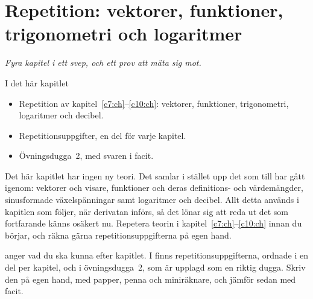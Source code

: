 
\chapter{Repetition: vektorer, funktioner, trigonometri och logaritmer}
\label{c11:ch}

{\large\itshape Fyra kapitel i ett svep, och ett prov att mäta sig mot.\par}

\begin{chapterbox}{I det här kapitlet}
\begin{itemize}
  \item Repetition av kapitel~\ref{c7:ch}--\ref{c10:ch}: vektorer, funktioner, trigonometri,
    logaritmer och decibel.
  \item Repetitionsuppgifter, en del för varje kapitel.
  \item Övningsdugga~2, med svaren i facit.
\end{itemize}
\end{chapterbox}

Det här kapitlet har ingen ny teori. Det samlar i stället upp det som  till
 har gått igenom: vektorer och visare, funktioner och deras definitions- och
värdemängder, sinusformade växelspänningar samt logaritmer och decibel. Allt detta används i
kapitlen som följer, när derivatan införs, så det lönar sig att reda ut det som fortfarande känns
osäkert nu. Repetera teorin i kapitel~\ref{c7:ch}--\ref{c10:ch} innan du börjar, och räkna gärna
repetitionsuppgifterna på egen hand.

 anger vad du ska kunna efter kapitlet. I 
finns repetitionsuppgifterna, ordnade i en del per kapitel, och i 
övningsdugga~2, som är upplagd som en riktig dugga. Skriv den på egen hand, med papper, penna och
miniräknare, och jämför sedan med facit.




